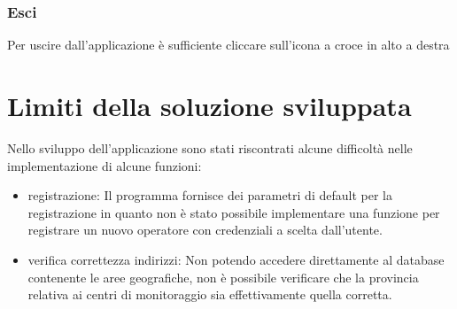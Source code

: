 \documentclass[12pt]{scrreprt}
\begin{document}
	\subsection{Esci}
	Per uscire dall’applicazione è sufficiente cliccare sull’icona a croce in alto a destra

	\chapter{Limiti della soluzione sviluppata}
	Nello sviluppo dell'applicazione sono stati riscontrati alcune difficoltà nelle implementazione di alcune funzioni:
	\begin{itemize}
		\item registrazione: Il programma fornisce dei parametri di default per la registrazione in quanto non è stato possibile implementare una funzione per registrare un nuovo operatore con credenziali a scelta dall'utente.
		
		\item verifica correttezza indirizzi: Non potendo accedere direttamente al database contenente le aree geografiche, non è possibile verificare che la provincia relativa ai centri di monitoraggio sia effettivamente quella corretta.
	\end{itemize}

	
	

	\nocite{IuriTex}
	
	
	\printindex
\end{document}
